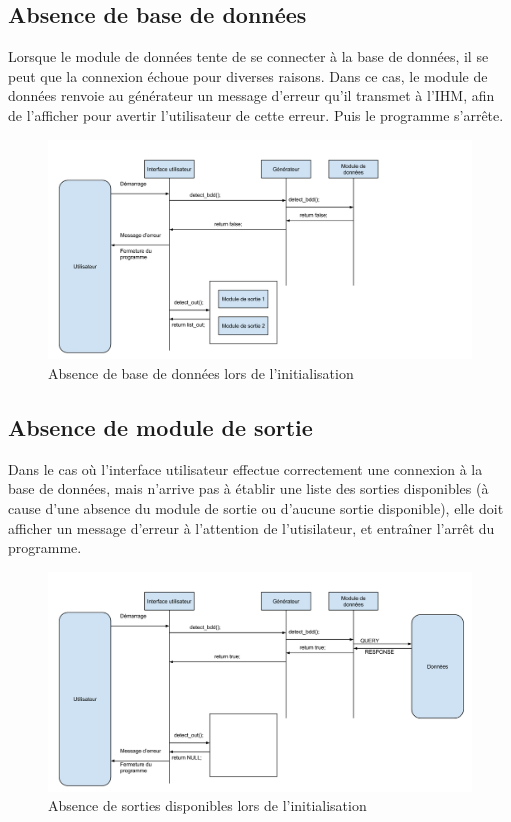 \subsection{Absence de base de données}
\label{scenarii:init:nobdd}
        
Lorsque le module de données tente de se connecter à la base de données, il 
se peut que la connexion échoue pour diverses raisons. Dans ce cas, le 
module de données renvoie au générateur un message d'erreur qu'il transmet à
 l'IHM, afin de l'afficher pour avertir l'utilisateur de cette erreur. Puis 
 le programme s'arrête.
        
\begin{figure}[H]
\includegraphics[width=\textwidth]{data/scenarii/demarrage_absence_bdd.png}
\caption{Absence de base de données lors de l'initialisation}
\end{figure}
        
\subsection{Absence de module de sortie}
\label{scenarii:init:noout}

Dans le cas où l'interface utilisateur effectue correctement une connexion à 
la base de données, mais n'arrive pas à établir une liste des sorties 
disponibles (à cause d'une absence du module de sortie ou d'aucune sortie 
disponible), elle doit afficher un message d'erreur à l'attention de 
l'utisilateur, et entraîner l'arrêt du programme.
        
\begin{figure}[H]
\includegraphics[width=\textwidth]{data/scenarii/demarrage_absence_sortie.png}
\caption{Absence de sorties disponibles lors de l'initialisation}
\end{figure}
 
